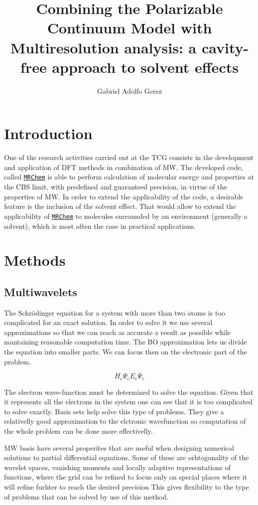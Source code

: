 \documentclass[a4paper,11pt]{article}
\title{Combining the Polarizable Continuum Model with Multiresolution
  analysis: a cavity-free approach to solvent effects}
\author{Gabriel Adolfo Gerez}
\newcommand{\mrchem}{\href{https://mrchem.readthedocs.io/en/latest/}{\texttt{MRChem}}}
\begin{document}
\maketitle

\section{Introduction}

One of the research activities carried out at the \ac{TCG} consists in
the development and application of \ac{DFT} methods in combination of
\ac{MW}. The developed code, called \mrchem{} is able to perform calculation of
molecular energy and properties at the \ac{CBS} limit, with
predefined and guaranteed precision, in virtue of the properties of
\ac{MW}. In order to extend the applicability of the code, a desirable
feature is the inclusion of the solvent effect. That would allow to
extend the applicability of \mrchem{} to molecules surrounded by an
environment (generally a solvent), which is most often the case in
practical applications.

\section{Methods}

\subsection{Multiwavelets}
The Schrödinger equation for a system with more than two atoms is too
complicated for an exact solution. In order to solve it we use several
approximations so that we can reach as accurate a result as possible
while mantaining reasonable computation time.  The \ac{BO}
approximation lets us divide the equation into smaller parts. We can
focus then on the electronic part of the problem.

\begin{equation}\label{eq:schrodinger}
H_e \Psi_e E_e \Psi_e
\end{equation}

 The electron wave-function must be determined to solve the
 equation. Given that it represents all the electrons in the system
 one can see that it is too complicated to solve exactly. Basis sets
 help solve this type of problems. They give a relativelly good
 approximation to the elctronic wavefunction so computation of the
 whole problem can be done more effectivelly.
 

\ac{MW} basis have several properites that are useful when designing
numerical solutions to partial differential equations. Some of these
are orhtogonality of the wavelet spaces, vanishing moments
and locally adaptive representations of functions, where the grid can
be refined to focus only on special places where it will refine
furhter to reach the desired precision %
This gives flexibility to the type of problems that can be solved by use of
this method.
\end{document}
